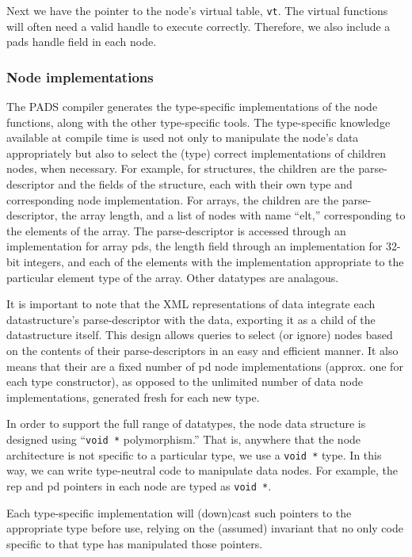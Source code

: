 Next we have the pointer to the node's virtual table, {\tt vt}. The
virtual functions will often need a valid \pads{} handle to execute
correctly. Therefore, we also include a pads handle field in each
node.

\subsubsection{Node implementations}
The PADS compiler generates the type-specific implementations of the
node functions, along with the other type-specific tools.  The
type-specific knowledge available at compile time is used not only to
manipulate the node's data appropriately but also to select the (type)
correct implementations of children nodes, when necessary.  For
example, for structures, the children are the parse-descriptor and the
fields of the structure, each with their own type and corresponding
node implementation.  For arrays, the children are the
parse-descriptor, the array length, and a list of nodes with name
``elt,'' corresponding to the elements of the array. The
parse-descriptor is accessed through an implementation for array pds,
the length field through an implementation for 32-bit integers, and
each of the elements with the implementation appropriate to the
particular element type of the array. Other datatypes are analagous.

It is important to note that the XML representations of \pads{} data
integrate each datastructure's parse-descriptor with the data,
exporting it as a child of the datastructure itself. This design
allows queries to select (or ignore) nodes based on the contents of
their parse-descriptors in an easy and efficient manner. It also means
that their are a fixed number of pd node implementations (approx. one for
each type constructor), as opposed to the unlimited number of data
node implementations, generated fresh for each new \pads{} type.

In order to support the full range of \pads{} datatypes,
the node data structure is designed using ``{\tt void *}
polymorphism.'' That is, anywhere that the node architecture is not
specific to a particular type, we use a {\tt void *} type. In this
way, we can write type-neutral code to manipulate data nodes. For
example, the rep and pd pointers in each node are typed as {\tt void
  *}. 

Each type-specific implementation will (down)cast such pointers to the
appropriate type before use, relying on the (assumed) invariant that
no only code specific to that type has manipulated those pointers.

